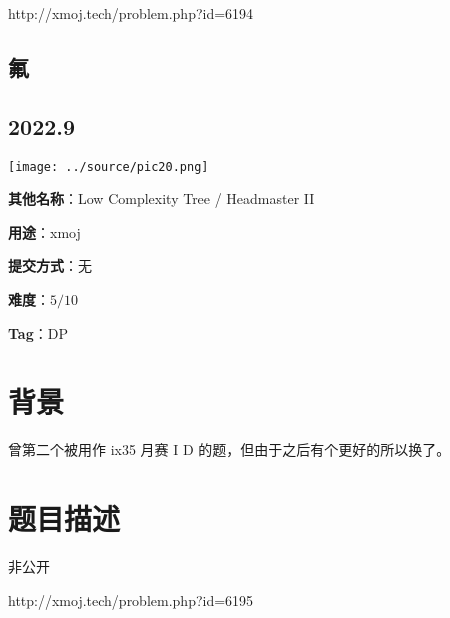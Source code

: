 \documentclass[a4paper,10pt]{article}
\begin{document}
http://xmoj.tech/problem.php?id=6194

\newpage

\vspace*{\fill}
\begin{center}

\section{氟}

\subsection*{2022.9}

\vspace{10pt}

\texttt{[image: ../source/pic20.png]}

\vspace{10pt}

\textbf{其他名称}：Low Complexity Tree / Headmaster II

\vspace{10pt}

\textbf{用途}：xmoj

\vspace{10pt}

\textbf{提交方式}：无

\vspace{10pt}

\textbf{难度}：$5/10$

\vspace{10pt}

\textbf{Tag}：DP

\end{center}
\vspace*{\fill}

\newpage

\section*{背景}

曾第二个被用作 ix35 月赛 I D 的题，但由于之后有个更好的所以换了。

\section*{题目描述}

非公开

http://xmoj.tech/problem.php?id=6195

\newpage
\end{document}
